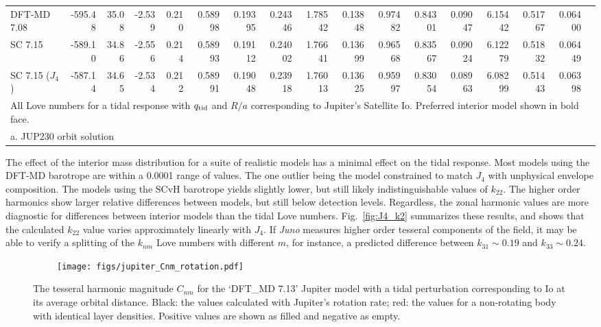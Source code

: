 \begin{sidewaystable}
\begin{adjustbox}{max width=\textheight}
\begin{tabular}{l|rrrr|rrrrrrrrrrrr}
DFT-MD 7.08        &  -595.48 &    35.08 &   -2.539 &     0.210 &   0.58998 &   0.19395 &   0.24346 &   1.78542 &   0.13848 &   0.97482 &   0.84301 &   0.09047 &   6.15442 &   0.51767 &   0.06400 \\
SC 7.15           &  -589.10 &    34.86 &   -2.556 &     0.214 &   0.58993 &   0.19112 &   0.24002 &   1.76641 &   0.13699 &   0.96568 &   0.83567 &   0.09024 &   6.12279 &   0.51832 &   0.06449 \\
SC 7.15 ($J_4$)         &  -587.14 &    34.65 &   -2.534 &     0.212 &   0.58991 &   0.19048 &   0.23918 &   1.76013 &   0.13625 &   0.95997 &   0.83054 &   0.08963 &   6.08299 &   0.51443 &   0.06398 \\
\hline
\multicolumn{16}{l}{All Love numbers for a tidal response with $q_{\rm tid}$ and $R/a$
corresponding to Jupiter's Satellite Io. Preferred interior model shown in bold
face.}\\
\multicolumn{16}{l}{a. JUP230 orbit solution \cite{jacobson2003}}
\end{tabular}

\end{adjustbox}
\end{sidewaystable}


The effect of the interior mass distribution for a suite of realistic models has a
minimal effect on the tidal response. Most models using the DFT-MD barotrope are
within a 0.0001 range of values. The one outlier being the model constrained to match
$J_4$ with unphysical envelope composition. The models using the SCvH barotrope
yields slightly lower, but still likely indistinguishable values of $k_{22}$. The
higher order harmonics show larger relative differences between models, but still
below detection levels. Regardless, the zonal harmonic values are more diagnostic for
differences between interior models than the tidal Love numbers. Fig.~\ref{fig:J4_k2}
summarizes these results, and shows that the calculated $k_{22}$ value varies
approximately linearly with $J_4$.  If \textit{Juno} measures higher order tesseral
components of the field, it may be able to verify a splitting of the $k_{nm}$ Love
numbers with different $m$, for instance, a predicted difference between
$k_{31}\sim0.19$ and $k_{33}\sim0.24$.


\begin{figure}[h!]  
  \centering
    \texttt{[image: figs/jupiter\_Cnm\_rotation.pdf]}
\caption{ The tesseral harmonic magnitude $C_{nm}$ for the `DFT\_MD 7.13' Jupiter
model with a tidal perturbation corresponding to Io at its average orbital distance.
Black: the values calculated with Jupiter's rotation rate; red: the values for
a non-rotating body with identical layer densities.  Positive values are shown as
filled and negative as empty.}
\label{fig:tesseral_rotation}
\end{figure}

